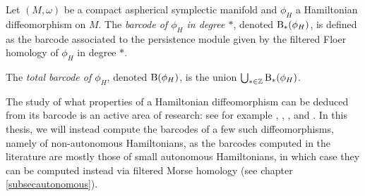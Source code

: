 \begin{definition}
Let $(M,\omega)$ be a compact aspherical symplectic manifold and $\phi_H$ a Hamiltonian diffeomorphism on $M$. The \emph{barcode of $\phi_H$ in degree $*$}, denoted $\mathrm{B}_*(\phi_H)$, is defined as the barcode associated to the persistence module given by the filtered Floer homology of $\phi_H$ in degree $*$.

The \emph{total barcode of $\phi_H$}, denoted $\mathrm{B}(\phi_H)$, is the union $\bigcup_{* \in \mathbb{Z}} \mathrm{B}_*(\phi_H)$.
\end{definition}

The study of what properties of a Hamiltonian diffeomorphism can be deduced from its barcode is an active area of research: see for example \cite{polterovich}, \cite{kislev2022bounds}, \cite{roux2018barcodes}, and \cite{polterovich2016autonomous}. In this thesis, we will instead compute the barcodes of a few such diffeomorphisms, namely of non-autonomous Hamiltonians, as the barcodes computed in the literature are mostly those of small autonomous Hamiltonians, in which case they can be computed instead via filtered Morse homology (see chapter \ref{subsecautonomous}).